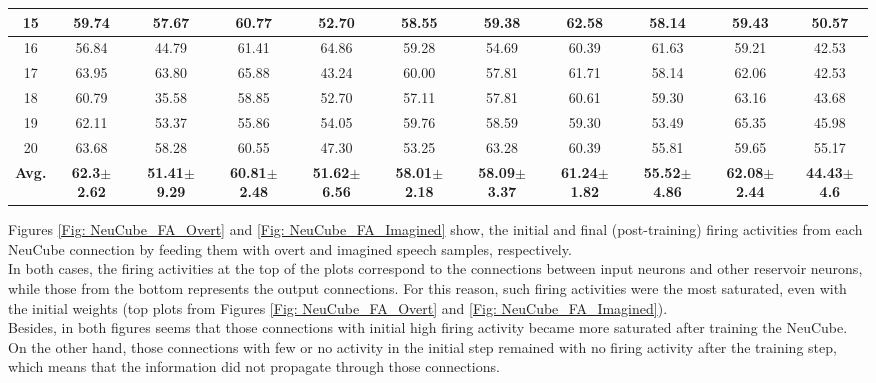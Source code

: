 \begin{table}[h!]
{\begin{tabular}{|*{11}{c|}}
			15 & 59.74 & 57.67 & 60.77 & 52.70 & 58.55 & 59.38 & 62.58 & 58.14 & 59.43 & 50.57 \\\hline
			16 & 56.84 & 44.79 & 61.41 & 64.86 & 59.28 & 54.69 & 60.39 & 61.63 & 59.21 & 42.53 \\\hline
			17 & 63.95 & 63.80 & 65.88 & 43.24 & 60.00 & 57.81 & 61.71 & 58.14 & 62.06 & 42.53 \\\hline
			18 & 60.79 & 35.58 & 58.85 & 52.70 & 57.11 & 57.81 & 60.61 & 59.30 & 63.16 & 43.68 \\\hline
			19 & 62.11 & 53.37 & 55.86 & 54.05 & 59.76 & 58.59 & 59.30 & 53.49 & 65.35 & 45.98 \\\hline
			20 & 63.68 & 58.28 & 60.55 & 47.30 & 53.25 & 63.28 & 60.39 & 55.81 & 59.65 & 55.17 \\\hline
			\textbf{Avg.} & \textbf{62.3}\boldmath$\pm$\textbf{2.62} & \textbf{51.41}\boldmath$\pm$\textbf{9.29} & \textbf{60.81}\boldmath$\pm$\textbf{2.48} & \textbf{51.62}\boldmath$\pm$\textbf{6.56} & \textbf{58.01}\boldmath$\pm$\textbf{2.18} & \textbf{58.09}\boldmath$\pm$\textbf{3.37} & \textbf{61.24}\boldmath$\pm$\textbf{1.82} & \textbf{55.52}\boldmath$\pm$\textbf{4.86} & \textbf{62.08}\boldmath$\pm$\textbf{2.44} & \textbf{44.43}\boldmath$\pm$\textbf{4.6} \\\hline
		\end{tabular}%
	}
	\label{Table: NeuCube_Imagined_Accuracies2}%
\end{table}%

Figures \ref{Fig: NeuCube_FA_Overt} and \ref{Fig: NeuCube_FA_Imagined} show, the initial and final (post-training) firing activities from each NeuCube connection by feeding them with overt and imagined speech samples, respectively.\\

In both cases, the firing activities at the top of the plots correspond to the connections between input neurons and other reservoir neurons, while those from the bottom represents the output connections. For this reason, such firing activities were the most saturated, even with the initial weights (top plots from Figures \ref{Fig: NeuCube_FA_Overt} and \ref{Fig: NeuCube_FA_Imagined}).\\

Besides, in both figures seems that those connections with initial high firing activity became more saturated after training the NeuCube. On the other hand, those connections with few or no activity in the initial step remained with no firing activity after the training step, which means that the information did not propagate through those connections.\\

